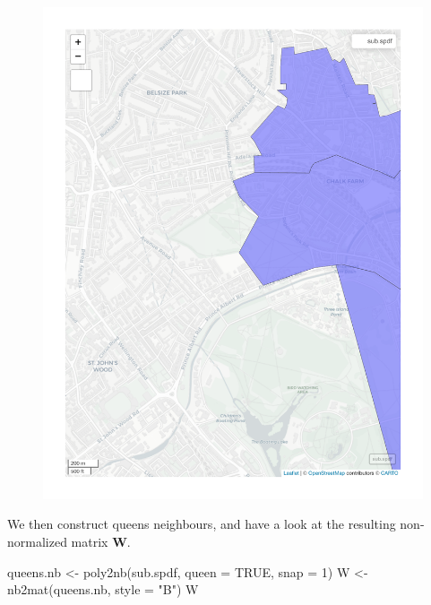 \documentclass[
  letterpaper,
]{scrbook}
\newenvironment{Shaded}{\begin{snugshade}}{\end{snugshade}}
\newcommand{\AttributeTok}[1]{\textcolor[rgb]{0.40,0.45,0.13}{#1}}
\newcommand{\ConstantTok}[1]{\textcolor[rgb]{0.56,0.35,0.01}{#1}}
\newcommand{\DecValTok}[1]{\textcolor[rgb]{0.68,0.00,0.00}{#1}}
\newcommand{\FunctionTok}[1]{\textcolor[rgb]{0.28,0.35,0.67}{#1}}
\newcommand{\NormalTok}[1]{\textcolor[rgb]{0.00,0.23,0.31}{#1}}
\newcommand{\OtherTok}[1]{\textcolor[rgb]{0.00,0.23,0.31}{#1}}
\newcommand{\StringTok}[1]{\textcolor[rgb]{0.13,0.47,0.30}{#1}}
\begin{document}
\begin{figure}[H]

{\centering \includegraphics{05_regression-theory_files/figure-pdf/unnamed-chunk-4-1.pdf}

}

\end{figure}

We then construct queens neighbours, and have a look at the resulting
non-normalized matrix \(\boldsymbol{\mathbf{W}}\).

\begin{Shaded}
\begin{Highlighting}[]
\NormalTok{queens.nb }\OtherTok{\textless{}{-}} \FunctionTok{poly2nb}\NormalTok{(sub.spdf, }\AttributeTok{queen =} \ConstantTok{TRUE}\NormalTok{, }\AttributeTok{snap =} \DecValTok{1}\NormalTok{)}
\NormalTok{W }\OtherTok{\textless{}{-}} \FunctionTok{nb2mat}\NormalTok{(queens.nb, }\AttributeTok{style =} \StringTok{"B"}\NormalTok{)}
\NormalTok{W}
\end{Highlighting}
\end{Shaded}
\end{document}
